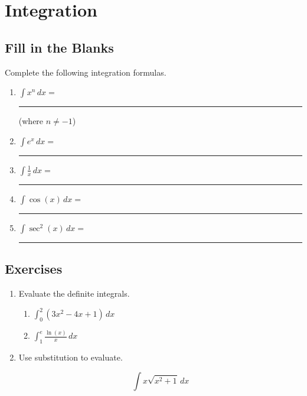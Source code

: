 \documentclass[
    language=english,
    doctype=workbook,
    institution=none,
]{../../omnilatex}
\begin{document}
\section{Integration}

\subsection{Fill in the Blanks}

Complete the following integration formulas.

\begin{enumerate}[label=\textbf{4.\arabic*}]

    \item $\displaystyle\int x^{n}\,dx = $ \rule{4cm}{0.4pt} \quad
          (where $n \neq -1$)

    \item $\displaystyle\int e^{x}\,dx = $ \rule{4cm}{0.4pt}

    \item $\displaystyle\int \frac{1}{x}\,dx = $ \rule{4cm}{0.4pt}

    \item $\displaystyle\int \cos(x)\,dx = $ \rule{4cm}{0.4pt}

    \item $\displaystyle\int \sec^{2}(x)\,dx = $ \rule{4cm}{0.4pt}

\end{enumerate}

\subsection{Exercises}

\begin{enumerate}[label=\textbf{5.\arabic*}]

    \item Evaluate the definite integrals.

    \begin{enumerate}[label=(\alph*)]
        \item $\displaystyle\int_{0}^{2} (3x^{2} - 4x + 1)\,dx$
        \vspace{3cm}

        \item $\displaystyle\int_{1}^{e} \frac{\ln(x)}{x}\,dx$
        \vspace{3cm}
    \end{enumerate}

    \item Use substitution to evaluate.

    \[
        \int x\sqrt{x^{2}+1}\,dx
    \]
    \vspace{4cm}

\end{enumerate}
\end{document}
